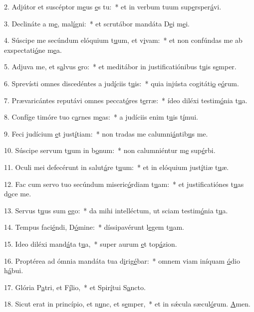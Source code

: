 2. Adjútor et suscéptor m\uline{e}us \uline{e}s tu:~* et in verbum tuum sup\uline{e}rsper\uline{á}vi.\par 
3. Declináte a m\uline{e}, mal\uline{í}gni:~* et scrutábor mandáta D\uline{e}i m\uline{e}i.\par 
4. Súscipe me secúndum elóquium t\uline{u}um, et v\uline{i}vam:~* et non confúndas me ab exspectati\uline{ó}ne m\uline{e}a.\par 
5. Adjuva me, et s\uline{a}lvus \uline{e}ro:~* et meditábor in justificatiónibus t\uline{u}is s\uline{e}mper.\par 
6. Sprevísti omnes discedéntes a jud\uline{í}ciis t\uline{u}is:~* quia injústa cogitáti\uline{o} e\uline{ó}rum.\par 
7. Prævaricántes reputávi omnes peccat\uline{ó}res t\uline{e}rræ:~* ídeo diléxi testim\uline{ó}nia t\uline{u}a.\par 
8. Confíge timóre tuo c\uline{a}rnes m\uline{e}as:~* a judíciis enim t\uline{u}is t\uline{í}mui.\par 
9. Feci judícium \uline{e}t just\uline{í}tiam:~* non tradas me calumni\uline{á}ntib\uline{u}s me.\par 
10. Súscipe servum t\uline{u}um in b\uline{o}num:~* non calumniéntur m\uline{e} sup\uline{é}rbi.\par 
11. Oculi mei defecérunt in salut\uline{á}re t\uline{u}um:~* et in elóquium just\uline{í}tiæ t\uline{u}æ.\par 
12. Fac cum servo tuo secúndum miseric\uline{ó}rdiam t\uline{u}am:~* et justificatiónes t\uline{u}as d\uline{o}ce me.\par 
13. Servus t\uline{u}us sum \uline{e}go:~* da mihi intelléctum, ut sciam testim\uline{ó}nia t\uline{u}a.\par 
14. Tempus faci\uline{é}ndi, D\uline{ó}mine:~* díssipavérunt l\uline{e}gem t\uline{u}am.\par 
15. Ideo diléxi mand\uline{á}ta t\uline{u}a,~* super aurum \uline{e}t top\uline{á}zion.\par 
16. Proptérea ad ómnia mandáta tua d\uline{i}rig\uline{é}bar:~* omnem viam iníquam \uline{ó}dio h\uline{á}bui.\par 
17. Glória P\uline{a}tri, et F\uline{í}lio,~* et Spir\uline{í}tui S\uline{a}ncto.\par 
18. Sicut erat in princípio, et n\uline{u}nc, et s\uline{e}mper,~* et in sǽcula sæcul\uline{ó}rum. \uline{A}men.\par 
